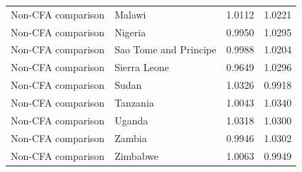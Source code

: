 \begin{table}
\begin{tabular}[t]{llrr}
Non-CFA comparison & Malawi & 1.0112 & 1.0221\\
Non-CFA comparison & Nigeria & 0.9950 & 1.0295\\
Non-CFA comparison & Sao Tome and Principe & 0.9988 & 1.0204\\
Non-CFA comparison & Sierra Leone & 0.9649 & 1.0296\\
\addlinespace
Non-CFA comparison & Sudan & 1.0326 & 0.9918\\
Non-CFA comparison & Tanzania & 1.0043 & 1.0340\\
Non-CFA comparison & Uganda & 1.0318 & 1.0300\\
Non-CFA comparison & Zambia & 0.9946 & 1.0302\\
Non-CFA comparison & Zimbabwe & 1.0063 & 0.9949\\
\bottomrule
\end{tabular}
\end{table}